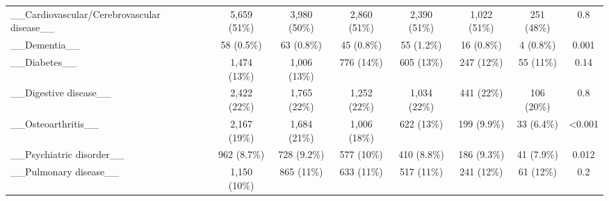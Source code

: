 \begin{tabular}{lccccccc}
\_\_Cardiovascular/Cerebrovascular disease\_\_ & 5,659 (51\%) & 3,980 (50\%) & 2,860 (51\%) & 2,390 (51\%) & 1,022 (51\%) & 251 (48\%) & 0.8\\
\_\_Dementia\_\_ & 58 (0.5\%) & 63 (0.8\%) & 45 (0.8\%) & 55 (1.2\%) & 16 (0.8\%) & 4 (0.8\%) & 0.001\\
\_\_Diabetes\_\_ & 1,474 (13\%) & 1,006 (13\%) & 776 (14\%) & 605 (13\%) & 247 (12\%) & 55 (11\%) & 0.14\\
\_\_Digestive disease\_\_ & 2,422 (22\%) & 1,765 (22\%) & 1,252 (22\%) & 1,034 (22\%) & 441 (22\%) & 106 (20\%) & 0.8\\
\_\_Osteoarthritis\_\_ & 2,167 (19\%) & 1,684 (21\%) & 1,006 (18\%) & 622 (13\%) & 199 (9.9\%) & 33 (6.4\%) & <0.001\\
\_\_Psychiatric disorder\_\_ & 962 (8.7\%) & 728 (9.2\%) & 577 (10\%) & 410 (8.8\%) & 186 (9.3\%) & 41 (7.9\%) & 0.012\\
\_\_Pulmonary disease\_\_ & 1,150 (10\%) & 865 (11\%) & 633 (11\%) & 517 (11\%) & 241 (12\%) & 61 (12\%) & 0.2\\
\bottomrule
\end{tabular}
